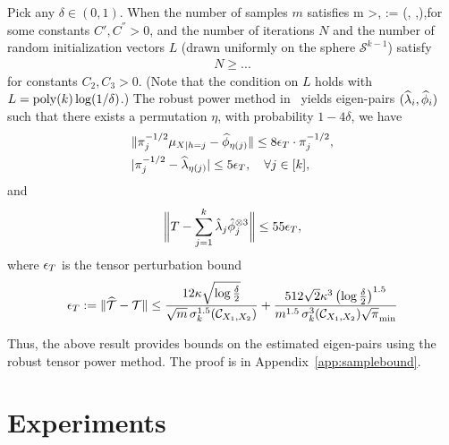 \documentclass{article}
\begin{document}
\begin{theorem}\label{thm:samplebound}
Pick  any $\delta\in (0,1)$. When the number of samples $m$ satisfies
\beq m >,
\quad \rho:= \max\left(, ,\right),\eeq for some constants $C', C^{''}>0$, and the number of iterations $N$  and  the number of random initialization vectors $L$  (drawn uniformly on the sphere $\mathcal{S}^{k-1}$)  satisfy
\begin{align*}
N \geq ...
\end{align*}
for constants $C_2,C_3>0$. (Note that the condition on $L$ holds with $L = \operatorname{poly}(k) \log(1/\delta)$.) The robust power method in~\cite{AnandkumarEtal:community12} yields eigen-pairs $(\widehat{\lambda}_i, \widehat{\phi}_i)$ such that there exists a permutation $\eta$, with probability $1-4\delta$, we have
\begin{align*}
&\|\pi^{-1/2}_{j} \mu_{X|h=j}-\widehat{\phi}_{\eta(j)}\| \leq 8 \epsilon_T \cdot\pi^{-1/2}_{j}
, \\
&|\pi^{-1/2}_{j}-\widehat{\lambda}_{\eta(j)}| \leq  5\epsilon_T, \quad \forall j \in [k]
,
\end{align*}
and
\[
\biggl\|
T - \sum_{j=1}^k \hat\lambda_j \hat{\phi}_j^{\otimes 3}
\biggr\| \leq 55\epsilon_T,
\] where $\epsilon_T$ is the tensor perturbation bound
\[ \epsilon_T := \|\widehat{{\mathcal{T}}} - {\mathcal{T}}\| \leq
\frac{12 \kappa \sqrt{\log\frac{\delta}{2}}}{\sqrt{m} \, \sigma_k^{1.5}(\mathcal{C}_{X_1, X_2})} + \frac{512 \sqrt{2} \kappa^3 \left(\log\frac{\delta}{2}\right)^{1.5}}{m^{1.5} \,\sigma_k^{3}(\mathcal{C}_{X_1, X_2}) \sqrt{\pi}_{\min}}\]

\end{theorem}

Thus, the above result provides bounds on the estimated eigen-pairs using the robust tensor power method.
The proof is in Appendix~\ref{app:samplebound}.

\section{Experiments}
\end{document}
